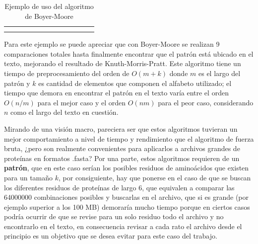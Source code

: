 \begin{table}[h]
\begin{tabular}{lllllllllllll}
                         & \cellcolor[HTML]{FFFFFF}                       & \cellcolor[HTML]{FFFFFF}                       & \cellcolor[HTML]{FFFFFF}                       & \cellcolor[HTML]{FFFFFF}                       & \cellcolor[HTML]{FFFFFF}                       & \cellcolor[HTML]{FFFFFF}                       & \cellcolor[HTML]{FFFFFF}                       & \cellcolor[HTML]{FFFFFF}                       & \cellcolor[HTML]{FFFFFF}                       & \cellcolor[HTML]{FFFFFF}                       & \cellcolor[HTML]{FFFFFF}                       &                        \\
                         &                                                &                                                &                                                &                                                &                                                &                                                &                                                &                                                &                                                &                                                &                                                &                       
\end{tabular}
\caption{Ejemplo de uso del algoritmo de Boyer-Moore}
\end{table}

Para este ejemplo se puede apreciar que con Boyer-Moore se realizan 9 comparaciones totales hasta finalmente encontrar que el patrón está ubicado en el texto, mejorando el resultado de Knuth-Morris-Pratt.
Este algoritmo tiene un tiempo de preprocesamiento del orden de $O(m+k)$ donde $m$ es el largo del patrón y $k$ es cantidad de elementos que componen el alfabeto utilizado; el tiempo que demora en encontrar el patrón en el texto varía entre el orden $O(n/m)$ para el mejor caso y el orden $O(nm)$ para el peor caso, considerando $n$ como el largo del texto en cuestión.

Mirando de una visión macro, pareciera ser que estos algoritmos tuvieran un mejor comportamiento a nivel de tiempo y rendimiento que el algoritmo de fuerza bruta, ¿pero son realmente convenientes para aplicarlos a archivos grandes de proteínas en formatos .fasta? Por una parte, estos algoritmos requieren de un \textbf{patrón}, que en este caso serían los posibles residuos de aminoácidos que existen para un tamaño $k$, por consiguiente, hay que ponerse en el caso de que se buscan los diferentes residuos de proteínas de largo 6, que equivalen a comparar las 64000000 combinaciones posibles y buscarlas en el archivo, que si es grande (por ejemplo superior a los 100 MB) demoraría mucho tiempo porque en ciertos casos podría ocurrir de que se revise para un solo residuo todo el archivo y no encontrarlo en el texto, en consecuencia revisar a cada rato el archivo desde el principio es un objetivo que se desea evitar para este caso del trabajo.

